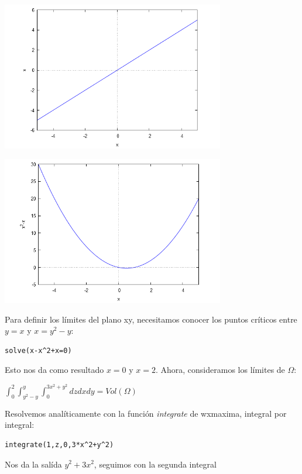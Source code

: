 \documentclass[a4paper]{article}
\begin{document}
\begin{center}
\includegraphics[height=6.5cm]{rep9_2.png}

\includegraphics[height=6.5cm]{rep9_3.png}
\end{center}

Para definir los límites del plano xy, necesitamos conocer los puntos críticos entre $y=x$ y $x=y^2-y$:

\begin{verbatim}
solve(x-x^2+x=0)
\end{verbatim}

Esto nos da como resultado $x=0$ y $x=2$. Ahora, consideramos los límites de $\Omega$:

\begin{center}
$\displaystyle \int^{2}_{0} \int^{y}_{y^2 -y} \int^{3x^2 +y^2}_{0} dz dx dy = Vol(\Omega)$
\end{center}

Resolvemos analíticamente con la función \textit{integrate} de wxmaxima, integral por integral:

\begin{verbatim}
integrate(1,z,0,3*x^2+y^2)
\end{verbatim}

Nos da la salída $y^2 + 3x^2$, seguimos con la segunda integral
\end{document}

